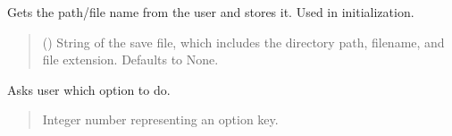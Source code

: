 \documentclass[letterpaper,10pt,english]{sphinxmanual}
\begin{document}
\begin{fulllineitems}
\begin{fulllineitems}
\label{\detokenize{Setup_PodDevices:Setup_PodDevices.Setup_PodDevices.SetupSaveFile}}
\pysigstartsignatures
{}
\pysigstopsignatures
\sphinxAtStartPar
Gets the path/file name from the user and stores it. Used in initialization.
\begin{quote}\begin{description}
\sphinxAtStartPar
{} (\sphinxstyleliteralemphasis{\sphinxupquote{{[}}}\sphinxstyleliteralemphasis{\sphinxupquote{,}}\sphinxstyleliteralemphasis{\sphinxupquote{|}}\sphinxstyleliteralemphasis{\sphinxupquote{{]} }}\sphinxstyleliteralemphasis{\sphinxupquote{| }}\sphinxstyleliteralemphasis{\sphinxupquote{, }}) \textendash{} String of the save file, which includes the directory path,                 filename, and file extension. Defaults to None.

\end{description}\end{quote}

\end{fulllineitems}


\begin{fulllineitems}
\label{\detokenize{Setup_PodDevices:Setup_PodDevices.Setup_PodDevices._AskOption}}
\pysigstartsignatures
{}
\pysigstopsignatures
\sphinxAtStartPar
Asks user which option to do.
\begin{quote}\begin{description}
\sphinxAtStartPar
Integer number representing an option key.


\end{description}
\end{quote}
\end{fulllineitems}
\end{fulllineitems}
\end{document}
